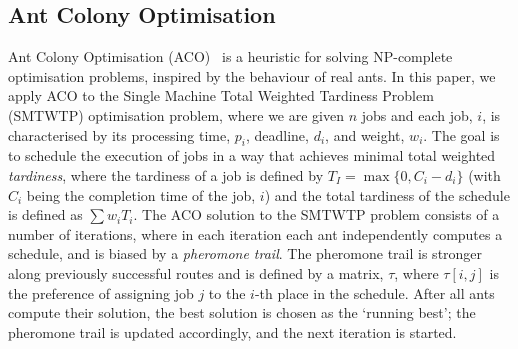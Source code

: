 \documentclass[smallextended]{svjour3}
\begin{document}



\subsection{Ant Colony Optimisation}
\noindent
Ant Colony Optimisation (ACO)~\cite{aco} is a heuristic for solving NP-complete
optimisation problems, inspired by the behaviour of real ants. In this paper, we apply ACO to the 
Single Machine Total Weighted Tardiness Problem (SMTWTP) optimisation
problem, where we are given $n$ jobs
and each job, $i$, is characterised by its processing time, $p_i$,
deadline, $d_i$,  and weight, $w_i$. The goal is to schedule the execution
of jobs in a way that achieves minimal total weighted
\emph{tardiness}, where the tardiness of a
job is defined by $T_I = \max \{0, C_i-d_i \}$ (with $C_i$ being the
completion time of the job, $i$) and the total tardiness
of the schedule is defined as $\sum w_i T_i$.
The ACO solution to the SMTWTP problem consists of a number of
iterations, where in each iteration each ant
independently computes a schedule, and is biased by
a \emph{pheromone trail}. The pheromone trail is stronger along previously successful routes and is defined 
by a matrix, $\tau$, where $\tau[i,j]$ is the preference of assigning 
job $j$ to the $i$-th place in the schedule. 
After all ants compute their solution, the best solution is chosen as
the `running best'; the pheromone trail is updated accordingly, and the next iteration is started.
\end{document}
